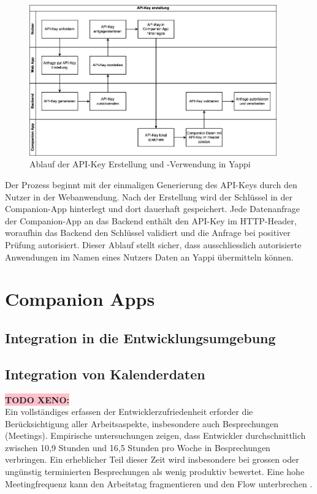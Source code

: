 \documentclass[12pt,a4paper]{report}
\newcommand{\xeno}[1]{\colorbox{pink}{\textbf{TODO XENO: #1}}\\}
\begin{document}
\begin{figure}[!htbp]
  \centering
  \includegraphics[width=0.95\textwidth]{../figures/apikey-swimlane-diagram.drawio.png}
  \caption{Ablauf der API-Key Erstellung und -Verwendung in Yappi}
  \label{fig:apikey-swimlane}
\end{figure}

Der Prozess beginnt mit der einmaligen Generierung des API-Keys durch den Nutzer in der Webanwendung. Nach der Erstellung wird der
Schlüssel in der Companion-App hinterlegt und dort dauerhaft gespeichert. Jede Datenanfrage der Companion-App an das Backend
enthält den API-Key im HTTP-Header, woraufhin das Backend den Schlüssel validiert und die Anfrage bei positiver Prüfung
autorisiert. Dieser Ablauf stellt sicher, dass ausschliesslich autorisierte Anwendungen im Namen eines Nutzers Daten an Yappi
übermitteln können.

\section{Companion Apps}
\subsection{Integration in die Entwicklungsumgebung}
\subsection{Integration von Kalenderdaten}
\xeno{}

Ein vollständiges erfassen der Entwicklerzufriedenheit erforder die Berücksichtigung aller Arbeitsaspekte,
insbesondere auch Besprechungen (Meetings). Empirische untersuchungen zeigen, dass Entwickler durchschnittlich zwischen
10,9 Stunden und 16,5 Stunden pro Woche in Besprechungen verbringen. Ein erheblicher Teil dieser Zeit wird insbesondere
bei grossen oder ungünstig terminierten Besprechungen als wenig produktiv bewertet.
Eine hohe Meetingfrequenz kann den Arbeitstag fragmentieren und den Flow unterbrechen \cite{stray_understanding_2020, meyer_today_2021}.
\end{document}
